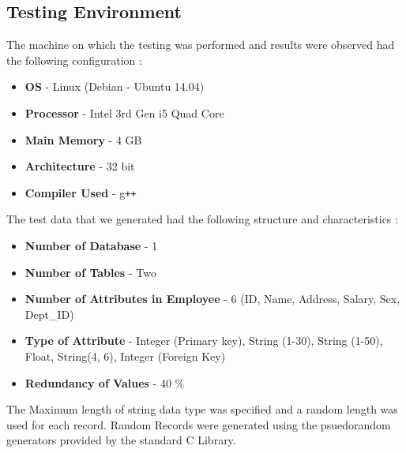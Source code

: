\documentclass[12pt, oneside]{book}
\begin{document}
\subsection{Testing Environment}
The machine on which the testing was performed and results were observed had the following configuration :
\begin{itemize}
 \item \textbf{OS} - Linux (Debian - Ubuntu 14.04)
 \item \textbf{Processor} - Intel 3rd Gen i5 Quad Core
 \item \textbf{Main Memory} - 4 GB
 \item \textbf{Architecture} - 32 bit
 \item \textbf{Compiler Used} - g\verb!++!
\end{itemize}
The test data that we generated had the following structure and characteristics :
\begin{itemize}
\item \textbf{Number of Database} - 1
 \item \textbf{Number of Tables} - Two
 \item \textbf{Number of Attributes in Employee} - 6 (ID, Name, Address, Salary, Sex, Dept\_ID)
 \item \textbf{Type of Attribute} - Integer (Primary key), String (1-30), String (1-50), Float, String(4, 6), Integer (Foreign Key)
 \item \textbf{Redundancy of Values} - 40 \%
\end{itemize}
The Maximum length of string data type was specified and a random length was used for each record. Random Records were generated using the psuedorandom generators provided by the standard C Library.
\end{document}
